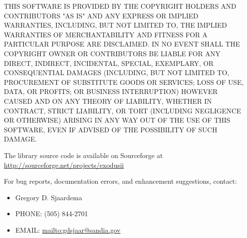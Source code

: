 THIS SOFTWARE IS PROVIDED BY THE COPYRIGHT HOLDERS AND CONTRIBUTORS
"AS IS" AND ANY EXPRESS OR IMPLIED WARRANTIES, INCLUDING, BUT NOT
LIMITED TO, THE IMPLIED WARRANTIES OF MERCHANTABILITY AND FITNESS FOR
A PARTICULAR PURPOSE ARE DISCLAIMED. IN NO EVENT SHALL THE COPYRIGHT
OWNER OR CONTRIBUTORS BE LIABLE FOR ANY DIRECT, INDIRECT, INCIDENTAL,
SPECIAL, EXEMPLARY, OR CONSEQUENTIAL DAMAGES (INCLUDING, BUT NOT
LIMITED TO, PROCUREMENT OF SUBSTITUTE GOODS OR SERVICES; LOSS OF USE,
DATA, OR PROFITS; OR BUSINESS INTERRUPTION) HOWEVER CAUSED AND ON ANY
THEORY OF LIABILITY, WHETHER IN CONTRACT, STRICT LIABILITY, OR TORT
(INCLUDING NEGLIGENCE OR OTHERWISE) ARISING IN ANY WAY OUT OF THE USE
OF THIS SOFTWARE, EVEN IF ADVISED OF THE POSSIBILITY OF SUCH DAMAGE.

The \exo{} library source code is available on Sourceforge at
\url{http://sourceforge.net/projects/exodusii}

For bug reports, documentation errors, and enhancement suggestions,
contact:
\begin{itemize}
   \item Gregory D. Sjaardema
   \item PHONE: (505) 844-2701
   \item EMAIL: \url{mailto:gdsjaar@sandia.gov}
\end{itemize}
